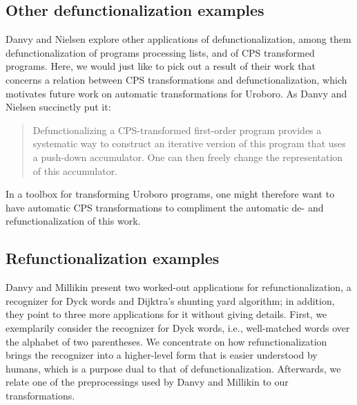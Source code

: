 \subsection{Other defunctionalization examples}
\label{ssec:defuncex}

Danvy and Nielsen\cite{danvy01defunctionalization} explore other applications of defunctionalization, among them defunctionalization of programs processing lists, and of CPS transformed programs. Here, we would just like to pick out a result of their work that concerns a relation between CPS transformations and defunctionalization, which motivates future work on automatic transformations for Uroboro. As Danvy and Nielsen succinctly put it:

\blockcquote[20]{danvy01defunctionalization}{Defunctionalizing a CPS-transformed first-order program provides a systematic way to construct an iterative version of this program that uses a push-down accumulator. One can then freely change the representation of this accumulator.}

In a toolbox for transforming Uroboro programs, one might therefore want to have automatic CPS transformations to compliment the automatic de- and refunctionalization of this work.

\subsection{Refunctionalization examples}
\label{ssec:refuncex}

Danvy and Millikin\cite{danvy09refunctionalization} present two worked-out applications for refunctionalization, a recognizer for Dyck words and Dijktra's shunting yard algorithm; in addition, they point to three more applications for it without giving details. First, we exemplarily consider the recognizer for Dyck words, i.e., well-matched words over the alphabet of two parentheses. We concentrate on how refunctionalization brings the recognizer into a higher-level form that is easier understood by humans, which is a purpose dual to that of defunctionalization. Afterwards, we relate one of the preprocessings used by Danvy and Millikin to our transformations.

